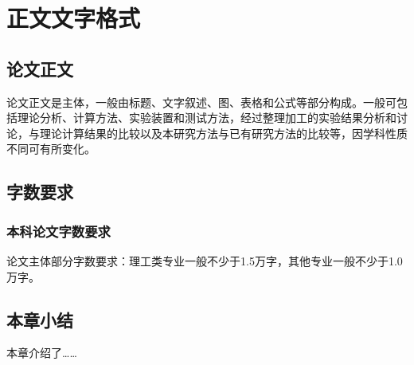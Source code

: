 \cleardoublepage



\section{正文文字格式}
\subsection{论文正文}
论文正文是主体，一般由标题、文字叙述、图、表格和公式等部分构成。一般可包括理论分析、计算方法、实验装置和测试方法，经过整理加工的实验结果分析和讨论，与理论计算结果的比较以及本研究方法与已有研究方法的比较等，因学科性质不同可有所变化。\par

\subsection{字数要求}
\subsubsection{本科论文字数要求}
论文主体部分字数要求：理工类专业一般不少于1.5万字，其他专业一般不少于1.0万字。

\subsection{本章小结}
本章介绍了……